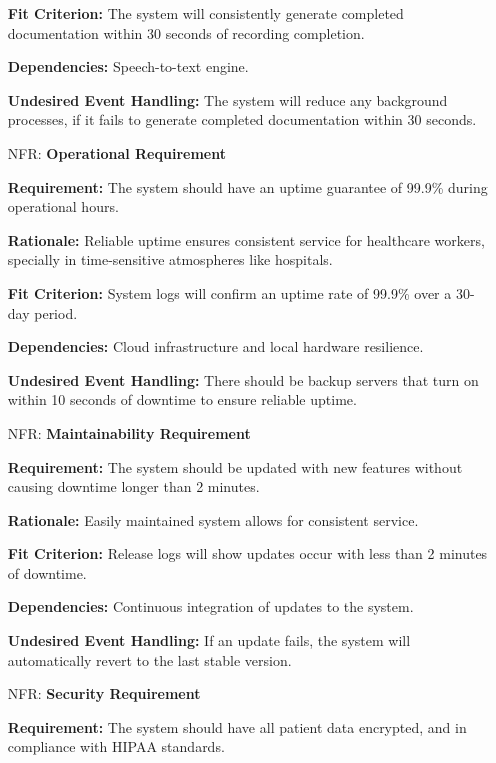 \documentclass[12pt]{article}
\newcounter{nfrnum} %
\begin{document}
\begin{itemize}
    \textbf{Fit Criterion:} The system will consistently generate completed documentation within 30 seconds of recording completion.  

    \textbf{Dependencies:} Speech-to-text engine.  

    \textbf{Undesired Event Handling:} The system will reduce any background processes, if it fails to generate completed documentation within 30 seconds.

\item[NFR\refstepcounter{nfrnum}\thenfrnum \label{NFR_Operational}:] \textbf{Operational Requirement}

    \textbf{Requirement:} The system should have an uptime guarantee of 99.9\% during operational hours.

    \textbf{Rationale:} Reliable uptime ensures consistent service for healthcare workers, specially in time-sensitive atmospheres like hospitals.

    \textbf{Fit Criterion:} System logs will confirm an uptime rate of 99.9\% over a 30-day period.  

    \textbf{Dependencies:} Cloud infrastructure and local hardware resilience. 
    
    \textbf{Undesired Event Handling:} There should be backup servers that turn on within 10 seconds of downtime to ensure reliable uptime.

\item[NFR\refstepcounter{nfrnum}\thenfrnum \label{NFR_Maintainability}:] \textbf{Maintainability Requirement}

    \textbf{Requirement:} The system should be updated with new features without causing downtime longer than 2 minutes.

    \textbf{Rationale:} Easily maintained system allows for consistent service.

    \textbf{Fit Criterion:} Release logs will show updates occur with less than 2 minutes of downtime.  

    \textbf{Dependencies:} Continuous integration of updates to the system.  

    \textbf{Undesired Event Handling:} If an update fails, the system will automatically revert to the last stable version.

\item[NFR\refstepcounter{nfrnum}\thenfrnum \label{NFR_Security}:] \textbf{Security Requirement}

    \textbf{Requirement:} The system should have all patient data encrypted, and in compliance with HIPAA standards.


\end{itemize}
\end{document}
